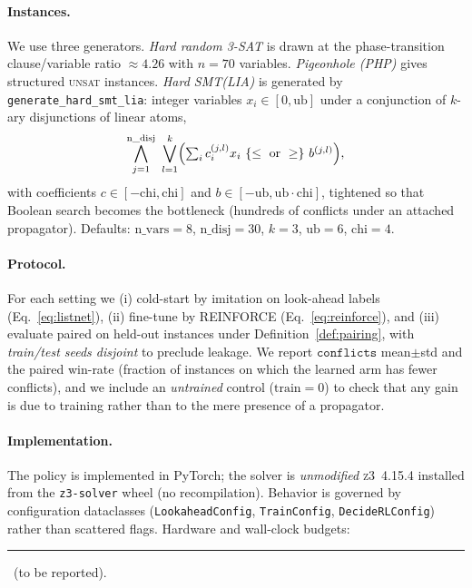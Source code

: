 \documentclass[letterpaper]{article} %
\theoremstyle{definition}
\theoremstyle{plain}
\theoremstyle{remark}
\newcommand{\blank}{\,\rule[-.1ex]{2.2em}{0.4pt}\,} %
\newcommand{\solver}{\textsc{z3}}
\newcommand{\confl}{\texttt{conflicts}}
\begin{document}
\paragraph{Instances.}
We use three generators. \emph{Hard random 3-SAT} is drawn at the
phase-transition clause/variable ratio $\approx 4.26$ with $n=70$ variables.
\emph{Pigeonhole (PHP)} gives structured \textsc{unsat} instances. \emph{Hard
SMT(LIA)} is generated by \texttt{generate\_hard\_smt\_lia}: integer
variables $x_i\in[0,\mathrm{ub}]$ under a conjunction of $k$-ary disjunctions
of linear atoms,
\begin{equation}
\bigwedge_{j=1}^{\mathrm{n\_disj}}\ \bigvee_{l=1}^{k}
\Bigl(\textstyle\sum_i c^{(j,l)}_i x_i\ \{\le\ \text{or}\ \ge\}\ b^{(j,l)}\Bigr),
\label{eq:smtgen}
\end{equation}
with coefficients $c\in[-\mathrm{chi},\mathrm{chi}]$ and
$b\in[-\mathrm{ub},\mathrm{ub}\cdot\mathrm{chi}]$, tightened so that Boolean
search becomes the bottleneck (hundreds of conflicts under an attached
propagator). Defaults: $\mathrm{n\_vars}{=}8$, $\mathrm{n\_disj}{=}30$,
$k{=}3$, $\mathrm{ub}{=}6$, $\mathrm{chi}{=}4$.

\paragraph{Protocol.}
For each setting we (i) cold-start by imitation on look-ahead labels
(Eq.~\ref{eq:listnet}), (ii) fine-tune by REINFORCE (Eq.~\ref{eq:reinforce}),
and (iii) evaluate paired on held-out instances under
Definition~\ref{def:pairing}, with \emph{train/test seeds disjoint} to
preclude leakage. We report $\confl$ mean$\pm$std and the paired win-rate
(fraction of instances on which the learned arm has fewer conflicts), and we
include an \emph{untrained} control ($\text{train}{=}0$) to check that any
gain is due to training rather than to the mere presence of a propagator.

\paragraph{Implementation.}
The policy is implemented in PyTorch; the solver is \emph{unmodified}
\solver{}~4.15.4 installed from the \texttt{z3-solver} wheel (no
recompilation). Behavior is governed by configuration dataclasses
(\texttt{LookaheadConfig}, \texttt{TrainConfig}, \texttt{DecideRLConfig})
rather than scattered flags. Hardware and wall-clock budgets: \blank{}
(to be reported).

\end{document}
